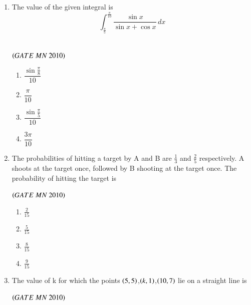 \documentclass{article}
\begin{document}
\begin{enumerate}[label=Q.\arabic*., itemsep=1em, leftmargin=0pt, itemindent=*, labelsep=0.5em]
\begin{enumerate}[label=Q.\arabic*., start=17, leftmargin=2em]
\begin{enumerate}[label=Q.\arabic*., start=33, leftmargin=2em]
\begin{multicols}{4}
\begin{enumerate}[label=(\Alph*), leftmargin=4em]
\item $1$ in $556$
\item $1$ in $785$
\item $1$ in $833$
\item $1$ in $1024$
\end{enumerate}
\end{multicols}
\bigskip
\item The value of the given integral is
\[
\int_{\frac{\pi}{5}}^{\frac{\pi}{10}} \frac{\sin x}{\sin x + \cos x} \, dx
\]
\\
\begin{flushright}
\hfill$\left(GATE\ MN\ 2010\right)$
\end{flushright}
\begin{multicols}{4}
\begin{enumerate}[label=(\Alph*),leftmargin=4em]
\item $\dfrac{\sin \frac{\pi}{8}}{10}$
\item $\dfrac{\pi}{10}$
\item $\dfrac{\sin \frac{\pi}{5}}{10}$
\item $\dfrac{3\pi}{10}$
\end{enumerate}
\end{multicols}
\bigskip
\item  The probabilities of hitting a target by A and B are $\frac{1}{3}$ and $\frac{2}{5}$ respectively. A shoots at the target
once, followed by B shooting at the target once. The probability of hitting the target is
\\
\begin{flushright}
\hfill$\left(GATE\ MN\ 2010\right)$
\end{flushright}
\begin{multicols}{4}
\begin{enumerate}[label=(\Alph*),leftmargin=4em]
\item $\frac{2}{15}$
\item $\frac{5}{15}$
\item $\frac{8}{15}$
\item $\frac{9}{15}$
\end{enumerate}
\end{multicols}
\bigskip
\item  The value of k for which the points $\left(5,5\right)$,$\left(k,1\right)$,$\left(10,7\right)$ lie on a straight line is
\\
\begin{flushright}
\hfill$\left(GATE\ MN\ 2010\right)$

\end{flushright}
\end{enumerate}
\end{enumerate}
\end{enumerate}
\end{document}
